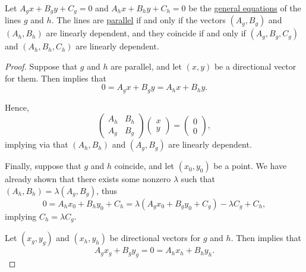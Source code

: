 \begin{proposition}\label{thm:parallel_lines_in_plane}
  Let \( A_g x + B_g y + C_g = 0 \) and \( A_h x + B_h y + C_h = 0 \) be the \hyperref[def:plane_line_equations/general]{general equations} of the lines \( g \) and \( h \). The lines are \hyperref[def:affine_parallelism]{parallel} if and only if the vectors \( (A_g, B_g) \) and \( (A_h, B_h) \) are linearly dependent, and they coincide if and only if \( (A_g, B_g, C_g) \) and \( (A_h, B_h, C_h) \) are linearly dependent.
\end{proposition}
\begin{proof}
  \SufficiencySubProof Suppose that \( g \) and \( h \) are parallel, and let \( (x, y) \) be a directional vector for them. Then  implies that
  \begin{equation*}
    0 = A_g x + B_g y = A_h x + B_h y.
  \end{equation*}

  Hence,
  \begin{equation*}
    \begin{pmatrix}
      A_h & B_h \\
      A_g & B_g
    \end{pmatrix}
    \begin{pmatrix}
      x \\ y
    \end{pmatrix}
    =
    \begin{pmatrix}
      0 \\ 0
    \end{pmatrix},
  \end{equation*}
  implying via  that \( (A_h, B_h) \) and \( (A_g, B_g) \) are linearly dependent.

  Finally, suppose that \( g \) and \( h \) coincide, and let \( (x_0, y_0) \) be a point. We have already shown that there exists some nonzero \( \lambda \) such that \( (A_h, B_h) = \lambda (A_g, B_g) \), thus
  \begin{equation*}
    0 = A_h x_0 + B_h y_0 + C_h = \lambda (A_g x_0 + B_g y_0 + C_g) - \lambda C_g + C_h,
  \end{equation*}
  implying \( C_h = \lambda C_g \).

  \NecessitySubProof Let \( (x_g, y_g) \) and \( (x_h, y_h) \) be directional vectors for \( g \) and \( h \). Then  implies that
  \begin{equation*}
    A_g x_g + B_g y_g = 0 = A_h x_h + B_h y_h.
  \end{equation*}


\end{proof}

